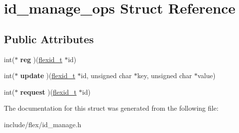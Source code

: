 \hypertarget{structid__manage__ops}{}\section{id\+\_\+manage\+\_\+ops Struct Reference}
\label{structid__manage__ops}
\subsection*{Public Attributes}
\begin{DoxyCompactItemize}
\item 
int($\ast$ {\bfseries reg} )(\hyperlink{structflexid}{flexid\+\_\+t} $\ast$id)\hypertarget{structid__manage__ops_a1f5dd93a784407384a1cb31e34f212e2}{}\label{structid__manage__ops_a1f5dd93a784407384a1cb31e34f212e2}

\item 
int($\ast$ {\bfseries update} )(\hyperlink{structflexid}{flexid\+\_\+t} $\ast$id, unsigned char $\ast$key, unsigned char $\ast$value)\hypertarget{structid__manage__ops_a4a50cc4475967070b64333cfbc95b659}{}\label{structid__manage__ops_a4a50cc4475967070b64333cfbc95b659}

\item 
int($\ast$ {\bfseries request} )(\hyperlink{structflexid}{flexid\+\_\+t} $\ast$id)\hypertarget{structid__manage__ops_abd048ab844f857df4ffe671e6075770d}{}\label{structid__manage__ops_abd048ab844f857df4ffe671e6075770d}

\end{DoxyCompactItemize}


The documentation for this struct was generated from the following file\+:\begin{DoxyCompactItemize}
\item 
include/flex/id\+\_\+manage.\+h\end{DoxyCompactItemize}
